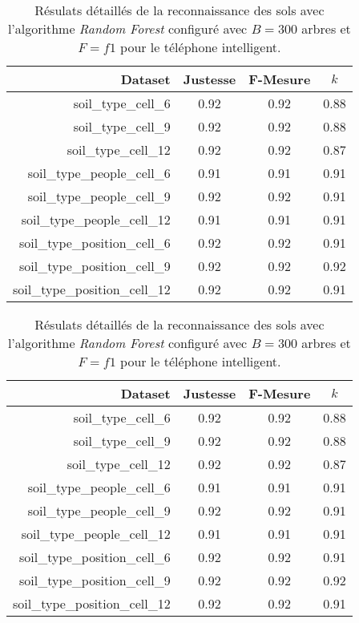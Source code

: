 \begin{table}[H]\renewcommand{\arraystretch}{0.5}
	\centering
	\caption{Résulats détaillés de la reconnaissance des sols avec l'algorithme \textit{Random Forest} configuré avec $B=300$ arbres et $F=f1$ pour le téléphone intelligent.}
	\label{tab:rf-300-cell}
	\begin{tabular}{@{}rccc@{}}
		\toprule
			\textbf{Dataset} & \textbf{Justesse} & \textbf{F-Mesure} & \textbf{$k$} \\
		\midrule
			soil\_type\_cell\_6 & 0.92 & 0.92 & 0.88 \\
			soil\_type\_cell\_9 & 0.92 & 0.92 & 0.88 \\
			soil\_type\_cell\_12 & 0.92 & 0.92 & 0.87 \\
			soil\_type\_people\_cell\_6 & 0.91 & 0.91 & 0.91 \\
			soil\_type\_people\_cell\_9 & 0.92 & 0.92 & 0.91 \\
			soil\_type\_people\_cell\_12 & 0.91 & 0.91 & 0.91 \\
			soil\_type\_position\_cell\_6 & 0.92 & 0.92 & 0.91 \\
			soil\_type\_position\_cell\_9 & 0.92 & 0.92 & 0.92 \\
			soil\_type\_position\_cell\_12 & 0.92 & 0.92 & 0.91 \\
		\bottomrule
	\end{tabular}
\end{table}

\begin{table}[H]\renewcommand{\arraystretch}{0.5}
	\centering
	\caption{Résulats détaillés de la reconnaissance des sols avec l'algorithme \textit{Random Forest} configuré avec $B=300$ arbres et $F=f1$ pour le téléphone intelligent.}
	\label{tab:rf-300-cell}
	\begin{tabular}{@{}rccc@{}}
		\toprule
			\textbf{Dataset} & \textbf{Justesse} & \textbf{F-Mesure} & \textbf{$k$} \\
		\midrule
			soil\_type\_cell\_6 & 0.92 & 0.92 & 0.88 \\
			soil\_type\_cell\_9 & 0.92 & 0.92 & 0.88 \\
			soil\_type\_cell\_12 & 0.92 & 0.92 & 0.87 \\
			soil\_type\_people\_cell\_6 & 0.91 & 0.91 & 0.91 \\
			soil\_type\_people\_cell\_9 & 0.92 & 0.92 & 0.91 \\
			soil\_type\_people\_cell\_12 & 0.91 & 0.91 & 0.91 \\
			soil\_type\_position\_cell\_6 & 0.92 & 0.92 & 0.91 \\
			soil\_type\_position\_cell\_9 & 0.92 & 0.92 & 0.92 \\
			soil\_type\_position\_cell\_12 & 0.92 & 0.92 & 0.91 \\
		\bottomrule
	\end{tabular}
\end{table}

